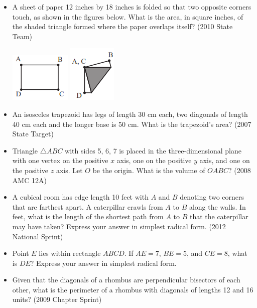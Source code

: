 \documentclass{article}
\begin{document}
\begin{itemize}

\item A sheet of paper 12 inches by 18 inches is folded so that two opposite corners touch, as shown in the figures below. What is the area, in square inches, of the shaded triangle formed where the paper overlaps itself? (2010 State Team)

\centerline{\includegraphics{20107.png} \qquad\includegraphics{201072.png}}

\item An isosceles trapezoid has legs of length 30 cm each, two diagonals of length 40 cm each and the longer base is 50 cm. What is the trapezoid's area? (2007 State Target)

\item Triangle $\triangle ABC$ with sides 5, 6, 7 is placed in the three-dimensional plane with one vertex on the positive $x$ axis, one on the positive $y$ axis, and one on the positive $z$ axis. Let $O$ be the origin. What is the volume of $OABC$? (2008 AMC 12A)

\item A cubical room has edge length 10 feet with $A$ and $B$ denoting two corners that are farthest apart. A caterpillar crawls from $A$ to $B$ along the walls. In feet, what is the length of the shortest path from $A$ to $B$ that the caterpillar may have taken? Express your answer in simplest radical form. (2012 National Sprint)

\item Point $E$ lies within rectangle $ABCD$. If $AE=7$, $BE=5$, and $CE=8$, what is $DE$? Express your answer in simplest radical form.

\item Given that the diagonals of a rhombus are perpendicular bisectors of each other, what is the perimeter of a rhombus with diagonals of lengths 12 and 16 units? (2009 Chapter Sprint)


\end{itemize}
\end{document}
